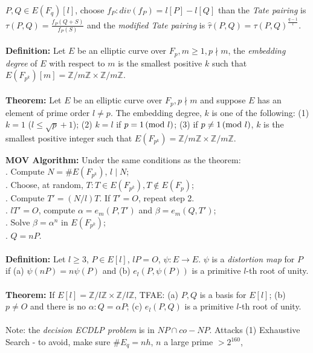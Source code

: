 $P, Q \in E(F_q)[l]$, choose $f_P: div(f_P)= l[P]-l[Q]$ than the \emph{Tate pairing}
is $\tau(P,Q)= {\frac {f_P(Q+S)}{f_P(S)}}$ and the \emph{modified Tate pairing} is
$\hat{\tau}(P,Q)= \tau(P, Q)^{\frac {q-1}{l}}$.
\\
\\
{\bf Definition:}
Let $E$ be an elliptic curve over $F_p, m \ge 1, p \nmid m$, the \emph{embedding degree}
of $E$ with respect to $m$ is the smallest positive $k$ such that
$E(F_{p^k})[m]= {\mathbb Z}/m{\mathbb Z} \times {\mathbb Z}/m{\mathbb Z}$.
\\
\\
{\bf Theorem:}
Let $E$ be an elliptic curve over $F_p, p \nmid m$ and suppose $E$ has an element of
prime order $l \ne p$.  The embedding degree, $k$ is one of the following:
(1) $k=1$ ($l \le {\sqrt p}+1$);
(2) $k=l$ if $p=1 \thinspace \textnormal{(mod } l \textnormal{)}$;
(3) if $p \ne 1 \thinspace \textnormal{(mod } l \textnormal{)}$, $k$ is the smallest positive integer such that
$E(F_{p^k})= {\mathbb Z}/m{\mathbb Z} \times {\mathbb Z}/m{\mathbb Z}$.
\begin{quote}
\end{quote}
{\bf MOV Algorithm:}  Under the same conditions as the theorem:\\
. Compute $N= \#E(F_{p^k})$, $l \mid N$;\\
. Choose, at random, $T: T \in E(F_{p^k}), T \notin E(F_{p})$;\\
. Compute $T'= (N/l)T$.  If $T'=O$, repeat step 2.\\
. $lT'= O$, compute $\alpha= e_m(P, T')$ and $\beta= e_m(Q, T')$;\\
. Solve $\beta= \alpha^n$ in $E(F_{p^k})$;\\
. $Q=nP$.
\\
\\
{\bf Definition:}
Let $l \ge 3$, $P \in E[l]$, $lP=O$, $\psi: E \rightarrow E$.  $\psi$ is a
\emph{distortion map} for $P$ if (a) $\psi(nP)= n \psi(P)$ and (b)
$e_l(P, \psi(P))$ is a primitive $l$-th root of unity.
\\
\\
{\bf Theorem:}  If $E[l]=
{\mathbb Z}/l{\mathbb Z} \times {\mathbb Z}/l{\mathbb Z}$, TFAE:
(a) $P, Q$ is a basis for $E[l]$;
(b) $p \ne O$ and there is no $\alpha: Q= \alpha P$;
(c) $e_l(P,Q)$ is a primitive $l$-th root of unity.
\\
\\
Note: the \emph{decision ECDLP problem} is in $NP \cap co-NP$.  
Attacks (1) Exhaustive Search - 
to avoid, make sure $\#E_q=nh$, $n$ a large prime $>2^{160}$,
